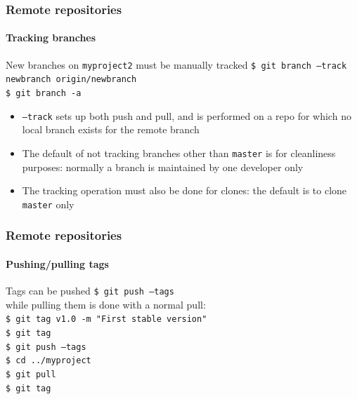 \begin{frame}
\frametitle{Remote repositories}
\framesubtitle{Tracking branches}

\begin{block}{New branches on \texttt{myproject2} must be manually tracked}
\texttt{\$ git branch ---track newbranch origin/newbranch} \\
\texttt{\$ git branch -a} \\

\begin{itemize}
\item \texttt{---track} sets up both push and pull, and is performed on a repo for which no local branch exists for the remote branch
\item The default of not tracking branches other than \texttt{master} is for cleanliness purposes: normally a branch is maintained by one developer only
\item The tracking operation must also be done for clones: the default is to clone \texttt{master} only
\end{itemize}
\end{block}

\end{frame}

\begin{frame}
\frametitle{Remote repositories}
\framesubtitle{Pushing/pulling tags}

\begin{block}{Tags can be pushed}
\texttt{\$ git push ---tags} \\

\medskip
while pulling them is done with a normal pull: \\

\texttt{\$ git tag v1.0 -m "First stable version"} \\
\texttt{\$ git tag} \\
\texttt{\$ git push ---tags} \\
\texttt{\$ cd ../myproject} \\
\texttt{\$ git pull} \\
\texttt{\$ git tag}
\end{block}

\end{frame}
